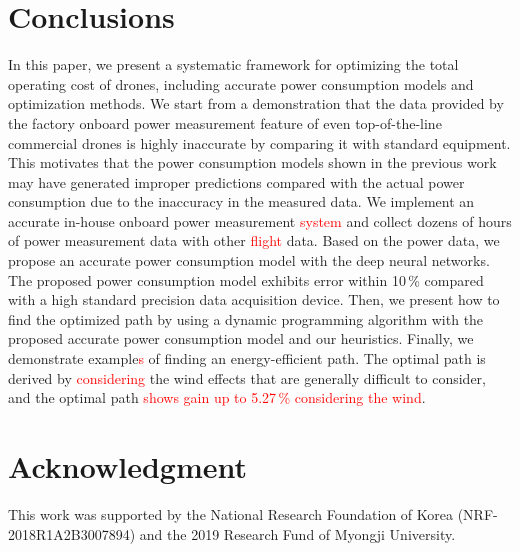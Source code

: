 \documentclass[journal]{./template/IEEEtran}
\begin{document}
\section{Conclusions}

In this paper, we present a systematic framework for optimizing the total operating cost of drones, including accurate power consumption models and optimization methods.
We start from a demonstration that the data provided by the factory onboard power measurement feature of even top-of-the-line commercial drones is highly inaccurate by comparing it with standard equipment. 
This motivates that the power consumption models shown in the previous work may have generated improper predictions compared with the actual power consumption due to the inaccuracy in the measured data.
We implement an accurate in-house onboard power measurement \textcolor{red}{system} and collect dozens of hours of power measurement data with other \textcolor{red}{flight} data. 
Based on the power data, we propose an accurate power consumption model with the deep neural networks. 
The proposed power consumption model exhibits error within 10\,\% compared with a high standard precision data acquisition device. 
Then, we present how to find the optimized path by using a dynamic programming algorithm with the proposed accurate power consumption model and our heuristics.
Finally, we demonstrate example\textcolor{red}{s} of finding an energy-efficient path.
The optimal path is derived by \textcolor{red}{considering} the wind effects that are generally difficult to consider, and the optimal path \textcolor{red}{shows gain up to 5.27\,\% considering the wind}.










\section*{Acknowledgment}
This work was supported by the National Research Foundation of Korea (NRF-2018R1A2B3007894) and the 2019 Research Fund of Myongji University. 
\end{document}

